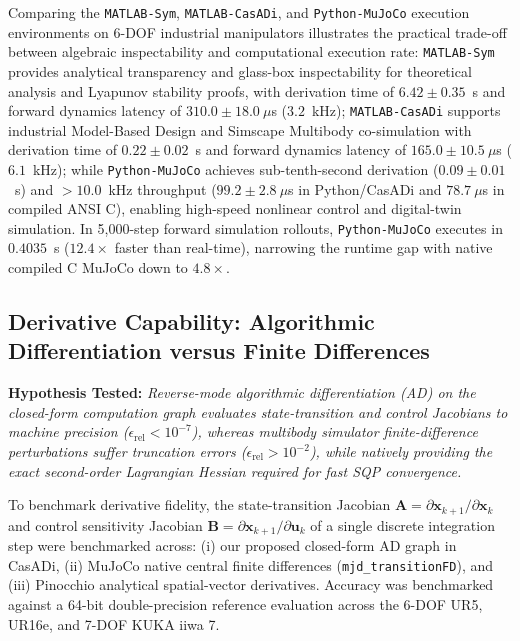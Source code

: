 \documentclass[fleqn,10pt]{article}
\begin{document}
Comparing the \texttt{MATLAB-Sym}, \texttt{MATLAB-CasADi}, and \texttt{Python-MuJoCo} execution environments on 6-DOF industrial manipulators illustrates the practical trade-off between algebraic inspectability and computational execution rate: \texttt{MATLAB-Sym} provides analytical transparency and glass-box inspectability for theoretical analysis and Lyapunov stability proofs, with derivation time of $6.42 \pm 0.35$~s and forward dynamics latency of $310.0 \pm 18.0~\mu$s ($3.2$~kHz); \texttt{MATLAB-CasADi} supports industrial Model-Based Design and Simscape Multibody co-simulation with derivation time of $0.22 \pm 0.02$~s and forward dynamics latency of $165.0 \pm 10.5~\mu$s ($6.1$~kHz); while \texttt{Python-MuJoCo} achieves sub-tenth-second derivation ($0.09 \pm 0.01$~s) and $>10.0$~kHz throughput ($99.2 \pm 2.8~\mu$s in Python/CasADi and $78.7~\mu$s in compiled ANSI C), enabling high-speed nonlinear control and digital-twin simulation. In 5,000-step forward simulation rollouts, \texttt{Python-MuJoCo} executes in $0.4035$~s ($12.4\times$ faster than real-time), narrowing the runtime gap with native compiled C MuJoCo down to $4.8\times$.

\subsection{Derivative Capability: Algorithmic Differentiation versus Finite Differences}

\noindent\textbf{Hypothesis Tested:} \textit{Reverse-mode algorithmic differentiation (AD) on the closed-form computation graph evaluates state-transition and control Jacobians to machine precision ($\epsilon_{\text{rel}} < 10^{-7}$), whereas multibody simulator finite-difference perturbations suffer truncation errors ($\epsilon_{\text{rel}} > 10^{-2}$), while natively providing the exact second-order Lagrangian Hessian required for fast SQP convergence.}

To benchmark derivative fidelity, the state-transition Jacobian $\bm{A} = \partial \bm{x}_{k+1}/\partial \bm{x}_k$ and control sensitivity Jacobian $\bm{B} = \partial \bm{x}_{k+1}/\partial \bm{u}_k$ of a single discrete integration step were benchmarked across: (i) our proposed closed-form AD graph in CasADi, (ii) MuJoCo native central finite differences (\texttt{mjd\_transitionFD}), and (iii) Pinocchio analytical spatial-vector derivatives. Accuracy was benchmarked against a 64-bit double-precision reference evaluation across the 6-DOF UR5, UR16e, and 7-DOF KUKA iiwa 7.
\end{document}
